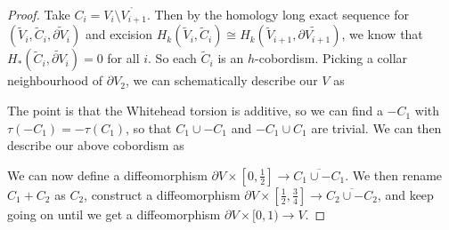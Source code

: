 \documentclass[a4paper, 12pt]{article}
\theoremstyle{definition}
\begin{document}
\begin{proof}
  Take $C_i = V_i \setminus \mathring{V_{i + 1}}$. Then by the homology long exact sequence for $(\tilde{V}_i, \tilde{C}_i, \widetilde{\partial V_i})$ and excision $H_k(\tilde{V}_i, \tilde{C}_i) \cong H_k(\tilde{V}_{i + 1}, \widetilde{\partial V_{i + 1}})$, we know that $H_*(\tilde{C}_i, \widetilde{\partial V}_i) = 0$ for all $i$. So each $\tilde{C}_i$ is an $h$-cobordism. Picking a collar neighbourhood of $\partial V_2$, we can schematically describe our $V$ as
  \begin{center}
  \end{center}
  The point is that the Whitehead torsion is additive, so we can find a $-C_1$ with $\tau(-C_1) = - \tau(C_1)$, so that $C_1 \cup -C_1$ and $-C_1 \cup C_1$ are trivial. We can then describe our above cobordism as
  \begin{center}
  \end{center}
  We can now define a diffeomorphism $\partial V \times [0, \frac{1}{2}] \to \overline{C_1 \cup -C_1}$. We then rename $C_1 + C_2$ as $C_2$, construct a diffeomorphism $\partial V \times [\frac{1}{2}, \frac{3}{4}] \to \overline{C_2 \cup -C_2}$, and keep going on until we get a diffeomorphism $\partial V \times [0, 1) \to V$.
\end{proof}
\end{document}
